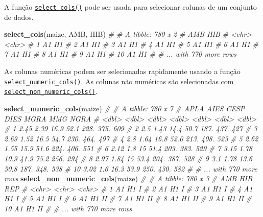 \documentclass[
]{book}
\newenvironment{Shaded}{\begin{snugshade}}{\end{snugshade}}
\newcommand{\CommentTok}[1]{\textcolor[rgb]{0.56,0.35,0.01}{\textit{#1}}}
\newcommand{\KeywordTok}[1]{\textcolor[rgb]{0.13,0.29,0.53}{\textbf{#1}}}
\newcommand{\NormalTok}[1]{#1}
\begin{document}
A função \href{https://tiagoolivoto.github.io/metan/reference/utils_rows_cols.html}{\texttt{select\_cols()}} pode ser usada para selecionar colunas de um conjunto de dados.

\begin{Shaded}
\begin{Highlighting}[]
\KeywordTok{select_cols}\NormalTok{(maize, AMB, HIB)}
\CommentTok{# # A tibble: 780 x 2}
\CommentTok{#    AMB   HIB  }
\CommentTok{#    <chr> <chr>}
\CommentTok{#  1 A1    H1   }
\CommentTok{#  2 A1    H1   }
\CommentTok{#  3 A1    H1   }
\CommentTok{#  4 A1    H1   }
\CommentTok{#  5 A1    H1   }
\CommentTok{#  6 A1    H1   }
\CommentTok{#  7 A1    H1   }
\CommentTok{#  8 A1    H1   }
\CommentTok{#  9 A1    H1   }
\CommentTok{# 10 A1    H1   }
\CommentTok{# # ... with 770 more rows}
\end{Highlighting}
\end{Shaded}

As colunas numéricas podem ser selecionadas rapidamente usando a função \href{https://tiagoolivoto.github.io/metan/reference/utils_rows_cols.html}{\texttt{select\_numeric\_cols()}}. As colunas não numéricas são selecionadas com \href{https://tiagoolivoto.github.io/metan/reference/utils_rows_cols.html}{\texttt{select\_non\_numeric\_cols()}}.

\begin{Shaded}
\begin{Highlighting}[]
\KeywordTok{select_numeric_cols}\NormalTok{(maize)}
\CommentTok{# # A tibble: 780 x 7}
\CommentTok{#     APLA  AIES  CESP  DIES  MGRA   MMG  NGRA}
\CommentTok{#    <dbl> <dbl> <dbl> <dbl> <dbl> <dbl> <dbl>}
\CommentTok{#  1  2.45  2.39  16.9  52.1 228.   375.   609}
\CommentTok{#  2  2.5   1.43  14.4  50.7 187.   437.   427}
\CommentTok{#  3  2.69  1.52  16.5  54.7 230.   464.   497}
\CommentTok{#  4  2.8   1.64  16.8  52.0 213.   408.   523}
\CommentTok{#  5  2.62  1.55  15.9  51.6 224.   406.   551}
\CommentTok{#  6  2.12  1.8   15    51.4 203.   383.   529}
\CommentTok{#  7  3.15  1.78  10.9  41.9  75.2  256.   294}
\CommentTok{#  8  2.97  1.84  15    53.4 204.   387.   528}
\CommentTok{#  9  3.1   1.78  13.6  50.8 187.   348.   538}
\CommentTok{# 10  3.02  1.6   16.3  53.9 250.   430.   582}
\CommentTok{# # ... with 770 more rows}
\KeywordTok{select_non_numeric_cols}\NormalTok{(maize)}
\CommentTok{# # A tibble: 780 x 3}
\CommentTok{#    AMB   HIB   REP  }
\CommentTok{#    <chr> <chr> <chr>}
\CommentTok{#  1 A1    H1    I    }
\CommentTok{#  2 A1    H1    I    }
\CommentTok{#  3 A1    H1    I    }
\CommentTok{#  4 A1    H1    I    }
\CommentTok{#  5 A1    H1    I    }
\CommentTok{#  6 A1    H1    II   }
\CommentTok{#  7 A1    H1    II   }
\CommentTok{#  8 A1    H1    II   }
\CommentTok{#  9 A1    H1    II   }
\CommentTok{# 10 A1    H1    II   }
\CommentTok{# # ... with 770 more rows}
\end{Highlighting}
\end{Shaded}
\end{document}
